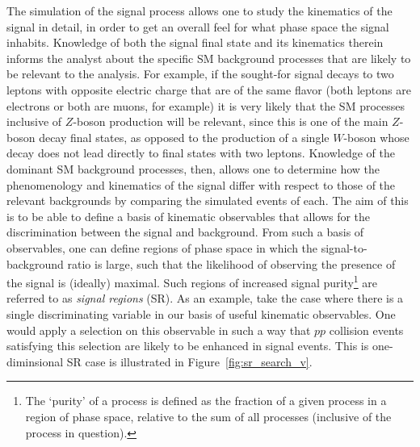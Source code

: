 The simulation of the signal process allows one to study the kinematics of the signal in detail, in order
to get an overall feel for what phase space the signal inhabits.
Knowledge of both the signal final state and its kinematics therein informs the analyst
about the specific SM background processes that are likely to be relevant to the analysis.
For example, if the sought-for signal decays to two leptons with opposite electric charge
that are of the same flavor (both leptons are electrons or both are muons, for example)
it is very likely that the SM processes inclusive of $Z$-boson production will be relevant,
since this is one of the main $Z$-boson decay final states, as opposed to the production of a single $W$-boson
whose decay does not lead directly to final states with two leptons.
Knowledge of the dominant SM background processes, then, allows
one to determine how the phenomenology and kinematics of the signal differ
with respect to those of the relevant backgrounds by comparing the simulated events
of each.
The aim of this is to be able to define a basis of kinematic observables that allows
for the discrimination between the signal and background.
From such a basis of observables, one can define regions of phase space in which
the signal-to-background ratio is large, such that the likelihood of observing
the presence of the signal is (ideally) maximal.
Such regions of increased signal purity\footnote{The `purity' of a process is defined
as the fraction of a given process in a region of phase space, relative to the sum
of all processes (inclusive of the process in question).} are referred
to as \textit{signal regions} (SR).
As an example, take the case where there is a single discriminating variable in our
basis of useful kinematic observables.
One would apply a selection on this observable in such a way that $pp$ collision events
satisfying this selection are likely to be enhanced in signal events.
This is one-diminsional SR case is illustrated in Figure~\ref{fig:sr_search_v}.

